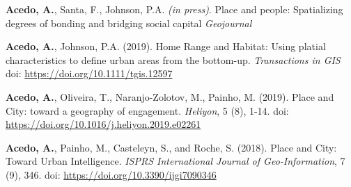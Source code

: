 \begin{cventries}

\vspace{-4mm}
  \cventry
    {} %
    {} %
    {} %
    {} %
    {\begin{cvitems} %
        \item {{\bf Acedo, A.}, Santa, F., Johnson, P.A. {\it (in press)}. Place and people: Spatializing degrees of bonding and bridging social capital {\it Geojournal}}
      \end{cvitems}}


\vspace{-4mm}
  \cventry
    {} %
    {} %
    {} %
    {} %
    {\begin{cvitems} %
        \item {{\bf Acedo, A.}, Johnson, P.A. (2019). Home Range and Habitat: Using platial characteristics to define urban areas from the bottom-up. {\it Transactions in GIS} doi: \url{ https://doi.org/10.1111/tgis.12597}}
      \end{cvitems}}


\vspace{-4mm}

  \cventry
    {} %
    {} %
    {} %
    {} %
    {\begin{cvitems} %
        \item {{\bf Acedo, A.}, Oliveira, T., Naranjo-Zolotov, M., Painho, M. (2019). Place and City: toward a geography of engagement. {\it Heliyon}, 5 (8), 1-14. doi: \url{ https://doi.org/10.1016/j.heliyon.2019.e02261}}
      \end{cvitems}}

\vspace{-4mm}
  \cventry
    {} %
    {} %
    {} %
    {} %
    {\begin{cvitems} %
        \item{{\bf Acedo, A.}, Painho, M., Casteleyn, S., and Roche, S. (2018). Place and City: Toward Urban Intelligence. {\it ISPRS International Journal of Geo-Information}, 7 (9), 346. doi: \url{ https://doi.org/10.3390/ijgi7090346}}
      \end{cvitems}}
      

\end{cventries}

